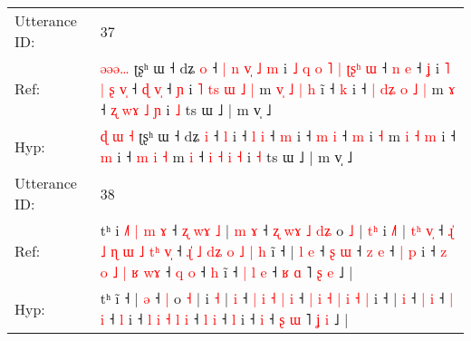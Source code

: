 \documentclass[10pt]{article}
\DeclareRobustCommand{\hl}[1]{{\textcolor{red}{#1}}}
\begin{document}
\begin{longtable}{ll}
 \\
\midrule
Utterance ID: & 37 \\
Ref: & \hl{}\hl{ə}\hl{ə}\hl{ə}\hl{…} ʈʂʰ ɯ ˧ dʑ \hl{o} ˧\hl{ }\hl{|}\hl{ }\hl{n}\hl{ }\hl{v}\hl{̩}\hl{ }\hl{˩} \hl{m} i\hl{ }\hl{˩}\hl{ }\hl{q}\hl{ }\hl{o}\hl{ }\hl{˥}\hl{ }\hl{|}\hl{ }\hl{ʈ}\hl{ʂ}\hl{ʰ}\hl{ }\hl{ɯ} ˧ \hl{n} \hl{e} ˧ \hl{ʝ} i\hl{ }\hl{˥}\hl{ }\hl{|}\hl{ }\hl{ʂ}\hl{ }\hl{v}\hl{̩} ˧ \hl{ɖ} \hl{v}\hl{̩} ˧ \hl{ɲ} i\hl{ }\hl{˥}\hl{ }\hl{t}\hl{s}\hl{ }\hl{ɯ}\hl{ }\hl{˩} \hl{|} m\hl{ }\hl{v}\hl{̩} \hl{˩} \hl{|} \hl{h} i\hl{̃} ˧ \hl{k} i ˧\hl{ }\hl{|}\hl{ }\hl{d}\hl{ʑ} \hl{o} \hl{˩} \hl{|} m \hl{ɤ} ˧ \hl{ʐ} \hl{w}\hl{ɤ} \hl{˩} \hl{ɲ} i \hl{˩} ts ɯ ˩ | m v̩ ˩
 \\
Hyp: & \hl{ɖ}\hl{ }\hl{ɯ}\hl{ }\hl{˧} ʈʂʰ ɯ ˧ dʑ \hl{i} ˧\hl{}\hl{}\hl{}\hl{}\hl{}\hl{}\hl{}\hl{}\hl{} \hl{l} i\hl{}\hl{}\hl{}\hl{}\hl{}\hl{}\hl{}\hl{}\hl{}\hl{}\hl{}\hl{}\hl{}\hl{}\hl{}\hl{} ˧ \hl{l} \hl{i} ˧ \hl{m} i\hl{}\hl{}\hl{}\hl{}\hl{}\hl{}\hl{}\hl{}\hl{} ˧ \hl{m} \hl{}\hl{i} ˧ \hl{m} i\hl{}\hl{}\hl{}\hl{}\hl{}\hl{}\hl{}\hl{}\hl{} \hl{˧} m\hl{}\hl{}\hl{} \hl{i} \hl{˧} \hl{m} i\hl{} ˧ \hl{m} i ˧\hl{}\hl{}\hl{}\hl{}\hl{} \hl{m} \hl{i} \hl{˧} m \hl{i} ˧ \hl{i} \hl{}\hl{˧} \hl{i} \hl{˧} i \hl{˧} ts ɯ ˩ | m v̩ ˩
 \\
\midrule
Utterance ID: & 38 \\
Ref: & tʰ i\hl{ }\hl{˩}\hl{˥}\hl{ }\hl{|}\hl{ }\hl{m}\hl{ }\hl{ɤ} ˧\hl{ }\hl{ʐ}\hl{ }\hl{w}\hl{ɤ}\hl{ }\hl{˩} |\hl{ }\hl{m} \hl{ɤ} ˧\hl{ }\hl{ʐ}\hl{ }\hl{w}\hl{ɤ}\hl{ }\hl{˩} \hl{d}\hl{ʑ} o \hl{˩} |\hl{ }\hl{t}\hl{ʰ} i \hl{˩}\hl{˥} |\hl{ }\hl{t}\hl{ʰ} \hl{v}\hl{̩} ˧\hl{ }\hl{ɻ}\hl{̍}\hl{ }\hl{˩} \hl{ɳ} \hl{ɯ} \hl{˩} \hl{t}\hl{ʰ} \hl{v}\hl{̩} ˧ \hl{ɻ}\hl{̍} \hl{˩} \hl{d}\hl{ʑ} \hl{o} \hl{˩} \hl{|} \hl{h} i\hl{̃} ˧ |\hl{ }\hl{l} \hl{e} ˧ \hl{ʂ} \hl{ɯ} ˧ \hl{z} \hl{e} ˧\hl{ }\hl{|} \hl{p} i ˧\hl{ }\hl{z} \hl{o} \hl{˩} \hl{|} \hl{ʁ} \hl{w}\hl{ɤ} ˧ \hl{q} \hl{o} ˧ \hl{h} i\hl{̃} ˧\hl{ }\hl{|}\hl{ }\hl{l} \hl{e} ˧ \hl{ʁ} \hl{ɑ} ˥ \hl{ʂ} \hl{e} ˩ |
 \\
Hyp: & tʰ i\hl{}\hl{}\hl{}\hl{}\hl{}\hl{}\hl{}\hl{}\hl{̃} ˧\hl{}\hl{}\hl{}\hl{}\hl{}\hl{}\hl{} |\hl{}\hl{} \hl{ə} ˧\hl{}\hl{}\hl{}\hl{}\hl{}\hl{}\hl{} \hl{}\hl{|} o \hl{˧} |\hl{}\hl{}\hl{} i \hl{}\hl{˧} |\hl{}\hl{}\hl{} \hl{}\hl{i} ˧\hl{}\hl{}\hl{}\hl{}\hl{} \hl{|} \hl{i} \hl{˧} \hl{}\hl{|} \hl{}\hl{i} ˧ \hl{}\hl{|} \hl{i} \hl{}\hl{˧} \hl{|} \hl{i} \hl{˧} \hl{|} i\hl{} ˧ |\hl{}\hl{} \hl{i} ˧ \hl{|} \hl{i} ˧ \hl{|} \hl{i} ˧\hl{}\hl{} \hl{l} i ˧\hl{}\hl{} \hl{l} \hl{i} \hl{˧} \hl{l} \hl{}\hl{i} ˧ \hl{l} \hl{i} ˧ \hl{l} i\hl{} ˧\hl{}\hl{}\hl{}\hl{} \hl{i} ˧ \hl{ʂ} \hl{ɯ} ˥ \hl{ʝ} \hl{i} ˩ |

\end{longtable}
\end{document}
